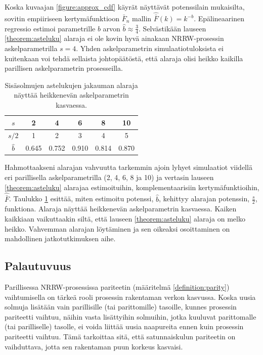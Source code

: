 \documentclass[finnish, 12pt, a4paper, sci, utf8, pdfa]{aaltothesis}
\begin{document}
Koska kuvaajan \ref{figure:approx_cdf} käyrät näyttävät potenssilain mukaisilta, sovitin empiiriseen kertymäfunktioon $ \bar{F}_{n} $ mallin $ \hat{\bar{F}}(k) = k^{-b} $. Epälineaarinen
regressio estimoi parametrille $ b $ arvon $ \hat{b} \approx \frac{3}{4} $. Selvästikään lauseen \ref{theorem:asteluku} alaraja ei ole kovin hyvä ainakaan NRRW-prosessin askelparametrilla 
$ s = 4 $. Yhden askelparametrin simulaatiotuloksista ei kuitenkaan voi tehdä sellaista johtopäätöstä, että alaraja olisi heikko kaikilla parillisen askelparametrin prosesseilla.

\begin{table}[htb]
   \begin{center}
   \renewcommand{\arraystretch}{1.2}
   \begin{tabular}{|c|c|c|c|c|c|}
   \hline
   $ s           $ & 2     & 4     & 6     & 8     & 10 \\ \hline
   $ s / 2       $ & 1     & 2     & 3     & 4     & 5 \\ \hline
   $ \hat{b}     $ & 0.645 & 0.752 & 0.910 & 0.814 & 0.870 \\ \hline
   \end{tabular}
   \end{center}
   \caption{Sisäsolmujen astelukujen jakauman alaraja näyttää heikkenevän askelparametrin kasvaessa.}
   \label{table:bound-test}
\end{table}
Hahmottaakseni alarajan vahvuutta tarkemmin ajoin lyhyet simulaatiot viidellä eri parillisella askelparametrilla (2, 4, 6, 8 ja 10) ja vertasin lauseen \ref{theorem:asteluku} 
alarajaa estimoituihin, komplementaarisiin kertymäfunktioihin, $\hat{\bar{F}}$. Taulukko \ref{table:bound-test} esittää, miten estimoitu potenssi, $ \hat{b} $, kehittyy alarajan 
potenssin, $ \frac{s}{2} $, funktiona. Alaraja näyttää heikkenevän askelparametrin kasvaessa. Kaiken kaikkiaan vaikuttaakin siltä, että lauseen \ref{theorem:asteluku} alaraja 
on melko heikko. Vahvemman alarajan löytäminen ja sen oikeaksi osoittaminen on mahdollinen jatkotutkimuksen aihe.

\subsection{Palautuvuus}

Parillisessa NRRW-prosessissa pariteetin (määritelmä \ref{definition:parity}) vaihtumisella on tärkeä rooli prosessin rakentaman verkon kasvussa. Koska uusia solmuja lisätään
vain parillisille (tai parittomille) tasoille, kunnes prosessin pariteetti vaihtuu, näihin vasta lisättyihin solmuihin, jotka kuuluvat parittomalle (tai parilliselle) tasolle,
ei voida liittää uusia naapureita ennen kuin prosessin pariteetti vaihtuu. Tämä tarkoittaa sitä, että satunnaiskulun pariteetin on vaihduttava, jotta sen rakentaman puun korkeus kasvaisi. 
\end{document}
